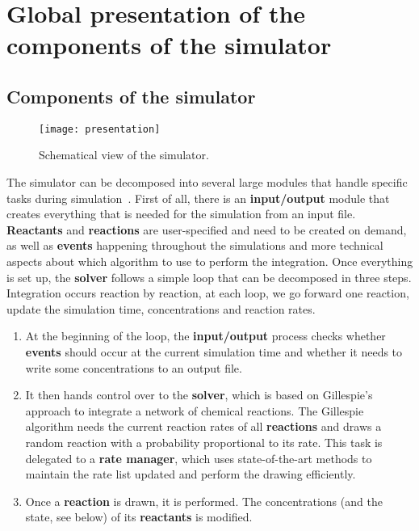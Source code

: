 \graphicspath{{\relativepath/figures/}}

\section{Global presentation of the components of the simulator}
\label{sec:global}

\subsection{Components of the simulator}

\begin{figure}[!ht]
        \centering
        \texttt{[image: presentation]}
	\caption{Schematical view of the simulator.}
\label{fig:presentation}
\end{figure}

The simulator can be decomposed into several large modules
that handle specific tasks during simulation~.
First of all, there is an \textbf{input/output} module that creates everything
that is needed for the simulation from an input file.
\textbf{Reactants} and \textbf{reactions} are user-specified and need to be created on demand,
as well as \textbf{events} happening throughout the simulations
and more technical aspects about which algorithm to use to perform the integration.
Once everything is set up, the \textbf{solver} follows a simple loop
that can be decomposed in three steps.
Integration occurs reaction by reaction, at each loop, we go forward one reaction,
update the simulation time, concentrations and reaction rates.

\begin{enumerate}
	\item At the beginning of the loop,
  the \textbf{input/output} process checks whether \textbf{events}
  should occur at the current simulation time and
  whether it needs to write some concentrations to an output file.
	\item It then hands control over to the \textbf{solver},
  which is based on Gillespie's approach to integrate a network of chemical reactions.
  The Gillespie algorithm needs the current reaction rates of all \textbf{reactions}
  and draws a random reaction with a probability proportional to its rate.
  This task is delegated to a \textbf{rate manager},
  which uses state-of-the-art methods to maintain the rate list updated and perform the drawing efficiently.
	\item Once a \textbf{reaction} is drawn, it is performed.
  The concentrations (and the state, see below) of its \textbf{reactants} is modified.
\end{enumerate}








